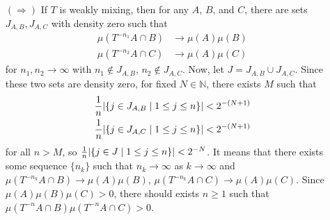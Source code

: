 \documentclass[12pt]{article}
\begin{document}
\begin{enumerate}
    \item[$(\Rightarrow)$] If $T$ is weakly mixing, then for any $A$, $B$, and $C$, there are sets $J_{A,B}, J_{A,C}$ with density zero such that 
    \begin{equation*}
        \begin{split}
            \mu(T^{-n_1}A\cap B)&\rightarrow \mu(A)\mu(B) \\
            \mu(T^{-n_2}A\cap C)&\rightarrow \mu(A)\mu(C)
        \end{split}
    \end{equation*}
    for $n_1,n_2\rightarrow \infty$ with $n_1\notin J_{A,B}$, $n_2\notin J_{A,C}$. Now, let $J=J_{A,B}\cup J_{A,C}$. Since these two sets are density zero, for fixed $N\in \mathbb{N}$, there exists $M$ such that 
    \begin{equation*}
    \begin{split}
        \frac{1}{n}\abs{\{j\in J_{A,B}\mid 1\leq j\leq n\}}&<2^{-(N+1)} \\
        \frac{1}{n}\abs{\{j\in J_{A,C}\mid 1\leq j\leq n\}}&<2^{-(N+1)}
    \end{split}
    \end{equation*}
    for all $n>M$, so $\frac{1}{n}\abs{\{j\in J\mid 1\leq j\leq n\}}<2^{-N}$.
    It means that there exists some sequence $\{n_k\}$ such that $n_k\rightarrow \infty$ as $k\rightarrow \infty$ and $\mu(T^{-n_k} A\cap B)\rightarrow \mu(A)\mu(B)$,
    $\mu(T^{-n_k}A\cap C)\rightarrow \mu(A)\mu(C)$. Since $\mu(A)\mu(B)\mu(C)>0$, there should exists $n\geq 1$ such that $\mu(T^{-n}A\cap B)\mu(T^{-n}A\cap C)>0$.
    

\end{enumerate}
\end{document}
